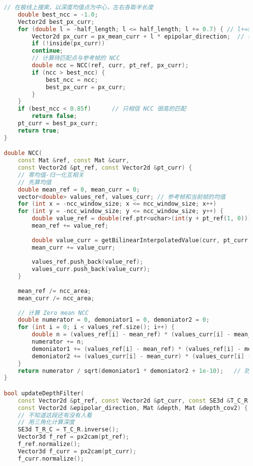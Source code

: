 \begin{lstlisting}[language=c++,caption=slambook2/ch12/dense\_monocular/dense\_mapping.cpp（片段）]
    // 在极线上搜索，以深度均值点为中心，左右各取半长度
    double best_ncc = -1.0;
    Vector2d best_px_curr;
    for (double l = -half_length; l <= half_length; l += 0.7) { // l+=sqrt(2)
        Vector2d px_curr = px_mean_curr + l * epipolar_direction;  // 待匹配点
        if (!inside(px_curr))
        continue;
        // 计算待匹配点与参考帧的 NCC
        double ncc = NCC(ref, curr, pt_ref, px_curr);
        if (ncc > best_ncc) {
            best_ncc = ncc;
            best_px_curr = px_curr;
        }
    }
    if (best_ncc < 0.85f)      // 只相信 NCC 很高的匹配
        return false;
    pt_curr = best_px_curr;
    return true;
}

double NCC(
    const Mat &ref, const Mat &curr,
    const Vector2d &pt_ref, const Vector2d &pt_curr) {
    // 零均值-归一化互相关
    // 先算均值
    double mean_ref = 0, mean_curr = 0;
    vector<double> values_ref, values_curr; // 参考帧和当前帧的均值
    for (int x = -ncc_window_size; x <= ncc_window_size; x++)
    for (int y = -ncc_window_size; y <= ncc_window_size; y++) {
        double value_ref = double(ref.ptr<uchar>(int(y + pt_ref(1, 0)))[int(x + pt_ref(0, 0))]) / 255.0;
        mean_ref += value_ref;
        
        double value_curr = getBilinearInterpolatedValue(curr, pt_curr + Vector2d(x, y));
        mean_curr += value_curr;
        
        values_ref.push_back(value_ref);
        values_curr.push_back(value_curr);
    }
    
    mean_ref /= ncc_area;
    mean_curr /= ncc_area;
    
    // 计算 Zero mean NCC
    double numerator = 0, demoniator1 = 0, demoniator2 = 0;
    for (int i = 0; i < values_ref.size(); i++) {
        double n = (values_ref[i] - mean_ref) * (values_curr[i] - mean_curr);
        numerator += n;
        demoniator1 += (values_ref[i] - mean_ref) * (values_ref[i] - mean_ref);
        demoniator2 += (values_curr[i] - mean_curr) * (values_curr[i] - mean_curr);
    }
    return numerator / sqrt(demoniator1 * demoniator2 + 1e-10);   // 防止分母出现零
}

bool updateDepthFilter(
    const Vector2d &pt_ref, const Vector2d &pt_curr, const SE3d &T_C_R,
    const Vector2d &epipolar_direction, Mat &depth, Mat &depth_cov2) {
    // 不知道这段还有没有人看
    // 用三角化计算深度
    SE3d T_R_C = T_C_R.inverse();
    Vector3d f_ref = px2cam(pt_ref);
    f_ref.normalize();
    Vector3d f_curr = px2cam(pt_curr);
    f_curr.normalize();
    

\end{lstlisting}
